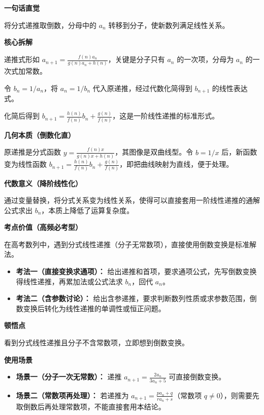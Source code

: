 \begin{explanationbox}
	\textbf{\textcolor{CExplanation}{一句话直觉}}

	将分式递推取倒数，分母中的 $a_n$ 转移到分子，使新数列满足线性关系。

	\medskip
	\textbf{\textcolor{CExplanation}{核心拆解}}
	\begin{description}[style=nextline, leftmargin=2.8em, labelsep=0.5em, itemsep=0.45em]
		\item[\textbf{要点一（识别分式结构）：}] 递推式形如 $a_{n+1} = \frac{f(n)a_n}{g(n)a_n+h(n)}$，关键是分子只有 $a_n$ 的一次项，分母为 $a_n$ 的一次式加常数。
		\item[\textbf{要点二（倒数变换技巧）：}] 令 $b_n = 1/a_n$，将 $a_n = 1/b_n$ 代入原递推，经过代数化简得到 $b_{n+1}$ 的线性表达式。
		\item[\textbf{要点三（代入化简得线性）：}] 化简后得到 $b_{n+1} = \frac{h(n)}{f(n)}b_n + \frac{g(n)}{f(n)}$，这是一阶线性递推的标准形式。
	\end{description}

	\medskip
	\textbf{\textcolor{CExplanation}{几何本质（倒数化直）}}

	原递推是分式函数 $y = \frac{f(n)x}{g(n)x+h(n)}$，其图像是双曲线型。令 $b=1/x$ 后，新函数变为线性函数 $b_{n+1} = \frac{h(n)}{f(n)}b_n + \frac{g(n)}{f(n)}$，即把曲线映射为直线，便于处理。

	\medskip
	\textbf{\textcolor{CExplanation}{代数意义（降阶线性化）}}

	通过变量替换，将分式关系变为线性关系，使得可以直接套用一阶线性递推的通解公式求出 $b_n$，本质上降低了运算复杂度。

	\medskip
	\textbf{\textcolor{CExplanation}{考点价值（高频必考型）}}

	在高考数列中，遇到分式线性递推（分子无常数项），直接使用倒数变换是标准解法。
	\begin{itemize}[leftmargin=*, itemsep=0.5em, topsep=0.4em]
		\item \textbf{考法一（直接变换求通项）：} 给出递推和首项，要求通项公式，先写倒数变换得线性递推，再累加法或公式法求 $b_n$，回代 $a_n$。
		\item \textbf{考法二（含参数讨论）：} 给出含参递推，要求判断数列性质或求参数范围，倒数变换后转化为线性递推的单调性或恒正问题。
	\end{itemize}

	\medskip
	\textbf{\textcolor{CExplanation}{顿悟点}}

	看到分式线性递推且分子不含常数项，立即想到倒数变换。

	\medskip
	\textbf{\textcolor{CExplanation}{使用场景}}
	\begin{itemize}[leftmargin=*, itemsep=0.5em, topsep=0.4em]
		\item \textbf{场景一（分子一次无常数）：} 递推 $a_{n+1}=\frac{2a_n}{3a_n+5}$ 可直接倒数变换。
		\item \textbf{场景二（常数项再处理）：} 若递推为 $a_{n+1}=\frac{p a_n+q}{r a_n+s}$（常数项 $q\neq 0$），则需要先取倒数后再处理常数项，不能直接套用本结论。
	\end{itemize}
\end{explanationbox}
